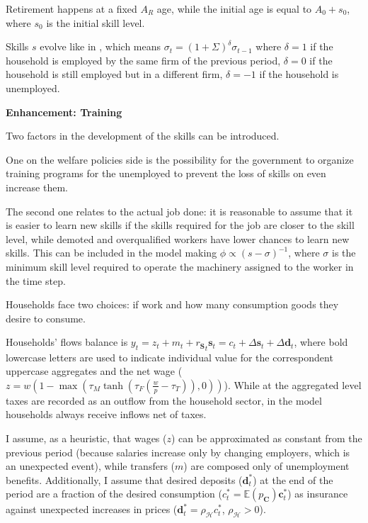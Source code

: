 \documentclass[a4paper, headings=standardclasses]{scrartcl}
\newenvironment{enh}[1][]{\begin{framed}\noindent\textbf{Enhancement: #1}\par}{\end{framed}}
\begin{document}
Retirement happens at a fixed $A_R$ age, while the initial age is equal to $A_0 + s_0$, where $s_0$ is the initial skill level.

Skills $s$ evolve like in \textcite{dosi2018}, which means $\sigma_t = (1+\Sigma)^\delta \sigma_{t-1}$ where $\delta=1$ if the household is employed by the same firm of the previous period, $\delta=0$ if the household is still employed but in a different firm, $\delta=-1$ if the household is unemployed.

\begin{enh}[Training]
	Two factors in the development of the skills can be introduced.

	One on the welfare policies side is the possibility for the government to organize training programs for the unemployed to prevent the loss of skills on even increase them.

	The second one relates to the actual job done: it is reasonable to assume that it is easier to learn new skills if the skills required for the job are closer to the skill level, while demoted and overqualified workers have lower chances to learn new skills. This can be included in the model making $\phi \propto (s-\sigma)^{-1}$, where $\sigma$ is the minimum skill level required to operate the machinery assigned to the worker in the time step.
\end{enh}

Households face two choices: if work and how many consumption goods they desire to consume.

Households' flows balance is $y_t = z_t + m_t + {r_{\mathbf{S}}}_t \mathbf{s}_t = c_t + {\Delta \mathbf{s}}_t + {\Delta \mathbf{d}}_t$, where bold lowercase letters are used to indicate individual value for the correspondent uppercase aggregates and the net wage ($z = w (1 - \max(\tau_M \tanh(\tau_F(\frac{w}{p}-\tau_T)),0))$).
While at the aggregated level taxes are recorded as an outflow from the household sector, in the model households always receive inflows net of taxes.

I assume, as a heuristic, that wages ($z$) can be approximated as constant from the previous period (because salaries increase only by changing employers, which is an unexpected event), while transfers ($m$) are composed only of unemployment benefits.
Additionally, I assume that desired deposits ($\mathbf{d}^*_t$) at the end of the period are a fraction of the desired consumption ($c^*_t = \mathbb{E}(p_\mathbf{C}) \mathbf{c}^*_t$) as insurance against unexpected increases in prices ($\mathbf{d}^*_t = \rho_\mathcal{H}c^*_t$, $\rho_\mathcal{H} > 0$).
\end{document}
